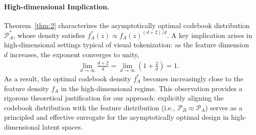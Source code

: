 \paragraph{High-dimensional Implication.}
Theorem~\ref{thm:2} characterizes the asymptotically optimal codebook distribution $\mathcal{P}^*_A$, whose density satisfies
$f^*_A(z) \propto f_A(z)^{(d+2)/d}$.
A key implication arises in high-dimensional settings typical of visual tokenization: as the feature dimension $d$ increases, the exponent converges to unity,
\begin{align}
\lim_{d\to\infty} \frac{d+2}{d} = \lim_{d\to\infty} \left(1+\frac{2}{d}\right) = 1.
\end{align}
As a result, the optimal codebook density $f^*_A$ becomes increasingly close to the feature density $f_A$ in the high-dimensional regime.
This observation provides a rigorous theoretical justification for our approach: explicitly aligning the codebook distribution with the feature distribution (i.e., $\mathcal{P}_B \approx \mathcal{P}_A$) serves as a principled and effective surrogate for the asymptotically optimal design in high-dimensional latent spaces.



